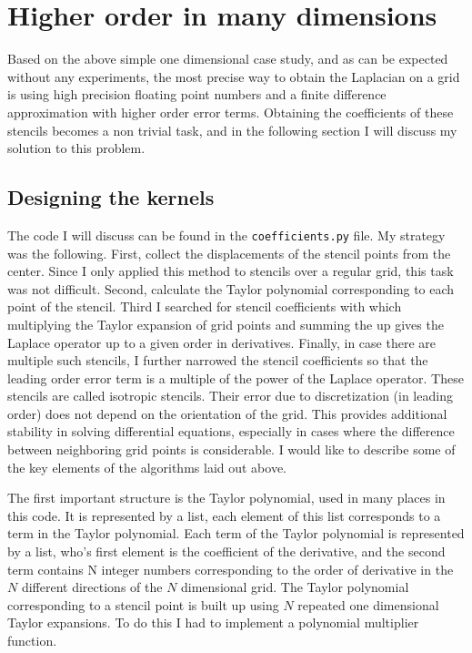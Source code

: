 \documentclass[pdftex,12pt,a4paper]{article}
\begin{document}
	\section{Higher order in many dimensions}
		Based on the above simple one dimensional case study, and as can be expected without any experiments, the most precise way to obtain the Laplacian on a grid is using high precision floating point numbers and a finite difference approximation with higher order error terms. Obtaining the coefficients of these stencils becomes a non trivial task, and in the following section I will discuss my solution to this problem.
	\subsection{Designing the kernels}
		The code I will discuss can be found in the \texttt{coefficients.py} file. My strategy was the following. First, collect the displacements of the stencil points from the center. Since I only applied this method to stencils over a regular grid, this task was not difficult. Second, calculate the Taylor polynomial corresponding to each point of the stencil. Third I searched for stencil coefficients with which multiplying the Taylor expansion of grid points and summing the up gives the Laplace operator up to a given order in derivatives. Finally, in case there are multiple such stencils, I further narrowed the stencil coefficients so that the leading order error term is a multiple of the power of the Laplace operator. These stencils are called isotropic stencils. Their error due to discretization (in leading order) does not depend on the orientation of the grid. This provides additional stability in solving differential equations, especially in cases where the difference between neighboring grid points is considerable. I would like to describe some of the key elements of the algorithms laid out above.
		
		The first important structure is the Taylor polynomial, used in many places in this code. It is represented by a list, each element of this list corresponds to a term in the Taylor polynomial. Each term of the Taylor polynomial is represented by a list, who's first element is the coefficient of the derivative, and the second term contains N integer numbers corresponding to the order of derivative in the $N$ different directions of the $N$ dimensional grid. The Taylor polynomial corresponding to a stencil point is built up using $N$ repeated one dimensional Taylor expansions. To do this I had to implement a polynomial multiplier function.
		
\end{document}
